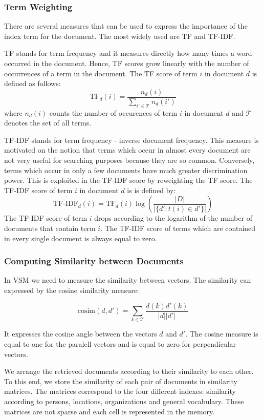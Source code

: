 \subsubsection{Term Weighting}
\label{sec:term_weighting}
There are several measures that can be used to express the importance of the index term for the document. The most widely used are TF and TF-IDF.

TF stands for term frequency and it measures directly how many times a word occurred in the document. Hence, TF scores grow linearly with the number of occurrences of a term in the document. The TF score of term $i$ in document $d$ is defined as follows:
\[\text{TF}_d(i) = \frac{n_d(i)}{\sum_{i' \in \mathcal{T}}{n_d(i')}}\]
where $n_d(i)$ counts the number of occurences of term $i$ in document $d$ and $\mathcal{T}$ denotes the set of all terms. 

TF-IDF stands for term frequency - inverse document frequency. This measure is motivated on the notion that terms which occur in almost every document are not very useful for searching purposes because they are so common. Conversely, terms which occur in only a few documents have much greater discrimination power. This is exploited in the TF-IDF score by reweighting the TF score. The TF-IDF score of term $i$ in document $d$ is is defined by:
\[\text{TF-IDF}_d(i)= \text{TF}_d(i)\log{\left(\frac{|D|}{|\lbrace d' : t(i) \in d' \rbrace|}\right)}\]
The TF-IDF score of term $i$ drops according to the logarithm of the number of documents that contain term $i$. The TF-IDF score of terms which are contained in every single document is always equal to zero.

\subsubsection{Computing Similarity between Documents}\label{sec:computing_similarity_between_documents}

In VSM we need to measure the similarity between vectors. The similarity can expressed by the cosine similarity measure:

\[\text{cosim}(d,d') = \sum_{k \in \mathcal{T}}\frac{d(k)d'(k)}{|d||d'|}\]

It expresses the cosine angle between the vectors $d$ and $d'$. The cosine measure is equal to one for the paralell vectors and is equal to zero for perpendicular vectors.

We arrange the retrieved documents according to their similarity to each other. To this end, we store the similarity of each pair of documents in similarity matrices. The matrices correspond to the four different indexes: similarity according to persons, locations, organizations and general vocabulary. These matrices are not sparse and each cell is represented in the memory.   

